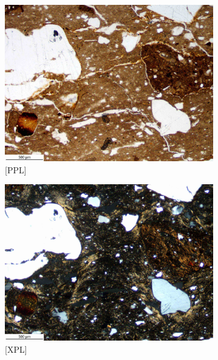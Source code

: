 \documentclass[a4paper]{article}
\begin{document}
\begin{figure}[H]
	\centering
	\begin{subfigure}[t]{.49\textwidth}
		\includegraphics[width=\textwidth]{ThinSections/42-1_4x_PPL.jpg}
		\caption{[PPL]}
	\end{subfigure}\hspace{.5em}\hfill
	\begin{subfigure}[t]{.49\textwidth}
		\includegraphics[width=\textwidth]{ThinSections/42-1_4x_XPL.jpg}
		\caption{[XPL]}
	\end{subfigure}
	\begin{subfigure}[t]{.49\textwidth}

\end{subfigure}
\end{figure}
\end{document}
